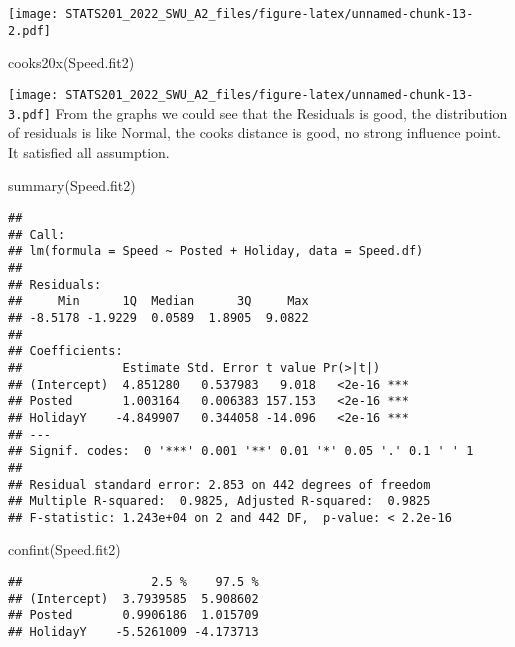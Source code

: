 \documentclass[
]{article}
\newenvironment{Shaded}{\begin{snugshade}}{\end{snugshade}}
\newcommand{\FunctionTok}[1]{\textcolor[rgb]{0.00,0.00,0.00}{#1}}
\newcommand{\NormalTok}[1]{#1}
\begin{document}
\texttt{[image: STATS201\_2022\_SWU\_A2\_files/figure-latex/unnamed-chunk-13-2.pdf]}

\begin{Shaded}
\begin{Highlighting}[]
\FunctionTok{cooks20x}\NormalTok{(Speed.fit2)}
\end{Highlighting}
\end{Shaded}

\texttt{[image: STATS201\_2022\_SWU\_A2\_files/figure-latex/unnamed-chunk-13-3.pdf]}
From the graphs we could see that the Residuals is good, the
distribution of residuals is like Normal, the cooks distance is good, no
strong influence point. It satisfied all assumption.

\begin{Shaded}
\begin{Highlighting}[]
\FunctionTok{summary}\NormalTok{(Speed.fit2)}
\end{Highlighting}
\end{Shaded}

\begin{verbatim}
## 
## Call:
## lm(formula = Speed ~ Posted + Holiday, data = Speed.df)
## 
## Residuals:
##     Min      1Q  Median      3Q     Max 
## -8.5178 -1.9229  0.0589  1.8905  9.0822 
## 
## Coefficients:
##              Estimate Std. Error t value Pr(>|t|)    
## (Intercept)  4.851280   0.537983   9.018   <2e-16 ***
## Posted       1.003164   0.006383 157.153   <2e-16 ***
## HolidayY    -4.849907   0.344058 -14.096   <2e-16 ***
## ---
## Signif. codes:  0 '***' 0.001 '**' 0.01 '*' 0.05 '.' 0.1 ' ' 1
## 
## Residual standard error: 2.853 on 442 degrees of freedom
## Multiple R-squared:  0.9825, Adjusted R-squared:  0.9825 
## F-statistic: 1.243e+04 on 2 and 442 DF,  p-value: < 2.2e-16
\end{verbatim}

\begin{Shaded}
\begin{Highlighting}[]
\FunctionTok{confint}\NormalTok{(Speed.fit2)}
\end{Highlighting}
\end{Shaded}

\begin{verbatim}
##                  2.5 %    97.5 %
## (Intercept)  3.7939585  5.908602
## Posted       0.9906186  1.015709
## HolidayY    -5.5261009 -4.173713
\end{verbatim}
\end{document}
